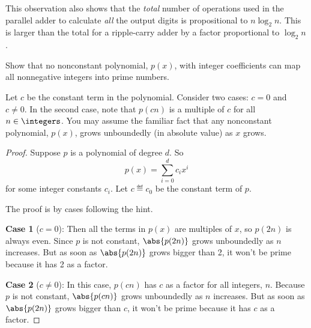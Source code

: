\documentclass[handout]{mcs}
\begin{document}
\begin{problem}
\begin{solution}
This observation also shows that the \emph{total} number of operations
used in the parallel adder to calculate \emph{all} the output digits is
propositional to $ n \log_2 n$.  This is larger than the total for a
ripple-carry adder by a factor proportional to $\log_2 n$.
\end{solution}

\eparts

\end{problem}

\begin{problem}
  Show that no nonconstant polynomial, $p(x)$, with integer coefficients
  can map all nonnegative integers into prime numbers.

  \hint Let $c$ be the constant term in the polynomial.  Consider two
  cases: $c=0$ and $c \neq 0$.  In the second case, note that $p(cn)$ is a
  multiple of $c$ for all $n \in \integers$.  You may assume the familiar
  fact that any nonconstant polynomial, $p(x)$, grows unboundedly (in
  absolute value) as $x$ grows.
 
\begin{solution}
\begin{proof}
Suppose $p$ is a polynomial of degree $d$. So
\[
p(x) = \sum_{i=0}^d c_ix^i
\]
for some integer constants $c_i$.  Let $c \eqdef c_0$ be the constant term
of $p$.

The proof is by cases following the hint.  

\textbf{Case 1} ($c = 0$): Then all the terms in $p(x)$ are multiples of
$x$, so $p(2n)$ is always even.  Since $p$ is not constant, $\abs{p(2n)}$
grows unboundedly as $n$ increases.  But as soon as $\abs{p(2n)}$
grows bigger than 2, it won't be prime because it has 2 as a factor.

\textbf{Case 2} ($c \neq 0$): In this case, $p(cn)$ has $c$ as a factor
for all integers, $n$.  Because $p$ is not constant, $\abs{p(cn)}$
grows unboundedly as $n$ increases.  But as soon as $\abs{p(2n)}$
grows bigger than $c$, it won't be prime because it has $c$ as a factor.
\end{proof}

\end{solution}

\end{problem}

\end{document}

